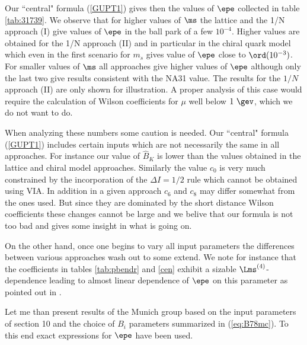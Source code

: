 Our ``central" formula (\ref{GUPT1}) gives then the values of $\epe$
collected in table \ref{tab:31739}. We observe that for higher values
of $\ms$ the lattice and the 1/N approach (I) give values of $\epe$ in
the ball park of a few $10^{-4}$. Higher values are obtained for
the 1/N approach (II) 
and in particular in the chiral quark
model which even in the first scenario for $m_s$ gives value of $\epe$
close to $\ord(10^{-3})$. For smaller values of $\ms$ all approaches
give higher values of $\epe$ although only the last two give results
consistent with the NA31 value.
The results for the $1/N$ approach (II) are only shown for illustration.
A proper analysis of this case would require the calculation of Wilson
coefficients for $\mu$ well below $1~\gev$, which we do not want to do.

When analyzing these numbers some caution is needed. 
Our ``central" formula (\ref{GUPT1}) includes certain inputs which
are not necessarily the same in all approaches. For instance our
value of $\hat B_K$ is lower than the values obtained in the
  lattice and chiral model approaches. Similarly the value $c_0$
is very much constrained by the incorporation of 
the $\Delta I=1/2$ rule which
cannot be obtained using VIA. In addition in a given approach
$c_6$ and $c_8$ may differ somewhat from the ones used. But since
they are dominated by the short distance Wilson coefficients these
changes cannot be large and
we belive that our formula is not too bad and gives some
insight in what is going on.

On the other hand, once one begins to vary all input parameters
the differences between various approaches wash out to some extend.
We note for instance that the coefficients in tables \ref{tab:pbendr}
and \ref{cen}
exhibit a sizable $\Lms^{(4)}$-dependence leading to almost linear
dependence of $\epe$ on this parameter as pointed out in \cite{BJLW}.  

Let me than present results of the Munich group based on the input
parameters of section 10 and the choice of $B_i$ parameters
summarized in (\ref{eq:B78mc}). To this end exact expressions for
$\epe$ have been used.

